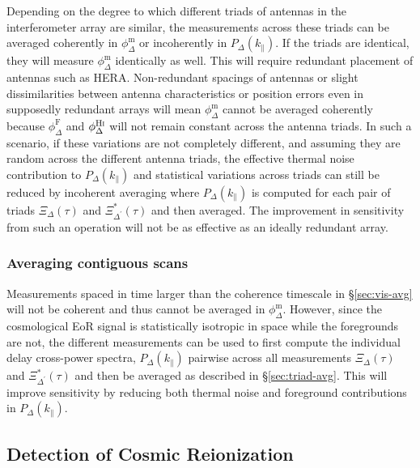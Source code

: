 \documentclass[
reprint,
superscriptaddress,
amsmath,
amssymb,
aps,
prd
]{revtex4-1}
\begin{document}
Depending on the degree to which different triads of antennas in the interferometer array are similar, the measurements across these triads can be averaged coherently in $\phi_\Delta^\textrm{m}$ or incoherently in $P_\Delta(k_\parallel)$. If the triads are identical, they will measure $\phi_\Delta^\textrm{m}$ identically as well. This will require redundant placement of antennas such as HERA. Non-redundant spacings of antennas or slight dissimilarities between antenna characteristics or position errors even in supposedly redundant arrays will mean $\phi_\Delta^\textrm{m}$ cannot be averaged coherently because $\phi_\Delta^\textrm{F}$ and $\phi_\Delta^\textrm{H{\sc i}}$ will not remain constant across the antenna triads. In such a scenario, if these variations are not completely different, and assuming they are random across the different antenna triads, the effective thermal noise contribution to $P_\Delta(k_\parallel)$ and statistical variations across triads can still be reduced by incoherent averaging where $P_\Delta(k_\parallel)$ is computed for each pair of triads $\Xi_\Delta(\tau)$ and $\Xi_{\Delta^\prime}^*(\tau)$ and then averaged. The improvement in sensitivity from such an operation will not be as effective as an ideally redundant array.

\subsubsection{Averaging contiguous scans}\label{sec:utc-avg}

Measurements spaced in time larger than the coherence timescale in \S\ref{sec:vis-avg} will not be coherent and thus cannot be averaged in $\phi_\Delta^\textrm{m}$. However, since the cosmological EoR signal is statistically isotropic in space while the foregrounds are not, the different measurements can be used to first compute the individual delay cross-power spectra, $P_\Delta(k_\parallel)$ pairwise across all measurements $\Xi_\Delta(\tau)$ and $\Xi_{\Delta^\prime}^*(\tau)$ and then be averaged as described in \S\ref{sec:triad-avg}. This will improve sensitivity by reducing both thermal noise and foreground contributions in $P_\Delta(k_\parallel)$. 


\subsection{Detection of Cosmic Reionization}\label{sec:EoR-detection}
\end{document}
